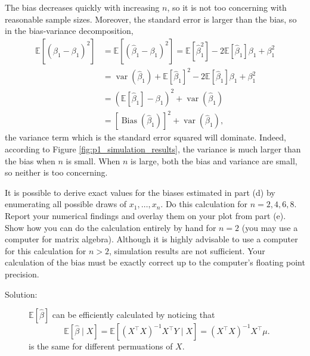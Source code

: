 \documentclass[11pt, letterpaper]{article}
\begin{document}
{\begin{enumerate}[(a)]
\begin{description}
  The bias decreases quickly with increasing $n$, so it is not too concerning
  with reasonable sample sizes. Moreover, the standard error is larger than the
  bias, so in the bias-variance decomposition,
  \begin{align*}
    \mathbb{E}\left[
      \left(\hat{\beta}_1 - \beta_1\right)^2
    \right]
    &=
      \mathbb{E}\left[
      \left(\hat{\beta}_1 - \beta_1\right)^2
      \right] =
    \mathbb{E}\left[\hat{\beta}_1^2\right] - 2\mathbb{E}\left[\hat{\beta}_1\right]\beta_1 + \beta_1^2  \\
    &= \operatorname{var}\left(\hat{\beta}_1\right) + \mathbb{E}\left[
      \hat{\beta}_1
      \right]^2  - 2\mathbb{E}\left[\hat{\beta}_1\right]\beta_1 + \beta_1^2  \\
    &= \left(\mathbb{E}\left[\hat{\beta}_1\right] - \beta_1\right)^2 + \operatorname{var}\left(\hat{\beta}_1\right) \\
    &= \left[\operatorname{Bias}\left(\hat{\beta}_1\right)\right]^2 + \operatorname{var}\left(\hat{\beta}_1\right),
  \end{align*}
  the variance term which is the standard error squared will dominate. Indeed,
  according to Figure \ref{fig:p1_simulation_results}, the variance is much
  larger than the bias when $n$ is small. When $n$ is large, both the bias and
  variance are small, so neither is too concerning.
\end{description}

{\item It is possible to derive exact values for the biases estimated in part (d) by enumerating all possible draws of $x_1, \ldots, x_n$.  Do this calculation for $n=2,4,6,8$.  Report your numerical findings and overlay them on your plot from part (e).   Show how you can do the calculation entirely by hand for $n=2$ (you may use a computer for matrix algebra).  Although it is highly advisable to use a computer for this calculation for $n>2$, simulation results are not sufficient.  Your calculation of the bias must be exactly correct up to the computer's floating point precision.}

\begin{description}
\item[Solution:] $\mathbb{E}\left[\hat{\beta}\right]$ can be efficiently
  calculated by noticing that
  \begin{equation}
    \mathbb{E}\left[\hat{\beta} \mid X \right] =
    \mathbb{E}\left[\left(X^\intercal X\right)^{-1}X^\intercal Y
      \mid X
    \right]
    = \left(X^\intercal X\right)^{-1}X^\intercal \mu.
  \end{equation}  
  is the same for different permuations of $X$.


\end{description}
\end{enumerate}}
\end{document}

